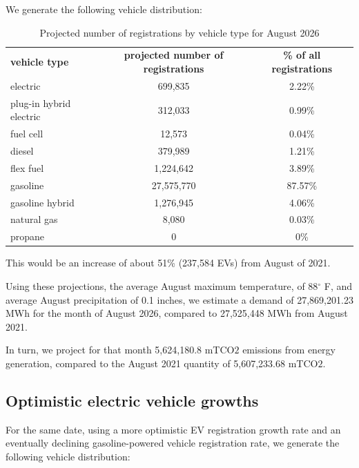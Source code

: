 \documentclass{article}
\begin{document}
We generate the following vehicle distribution:

\begin{table}[H]
    \centering
    \begin{tabular}{lcc}
        \textbf{vehicle type} & \textbf{projected number of registrations} & \textbf{\% of all registrations}\\
         electric & 699,835 & 2.22\%\\
         plug-in hybrid electric & 312,033 & 0.99\%\\
         fuel cell & 12,573 & 0.04\%\\
         diesel & 379,989 & 1.21\%\\
         flex fuel & 1,224,642 &  3.89\%\\
         gasoline & 27,575,770 & 87.57\%\\
         gasoline hybrid & 1,276,945 & 4.06\%\\
         natural gas & 8,080 & 0.03\%\\
         propane & 0 & 0\%
    \end{tabular}
    \caption{Projected number of registrations by vehicle type for August 2026}
    \label{table:projection}
\end{table}

This would be an increase of about 51\% (237,584 EVs) from August of 2021.

Using these projections, the average August maximum temperature, of 88$^{\circ}$ F, and average August precipitation of 0.1 inches, we estimate a demand of 27,869,201.23 MWh for the month of August 2026, compared to 27,525,448 MWh from August 2021.

In turn, we project for that month 5,624,180.8  mTCO\(2\) emissions from energy generation, compared to the August 2021 quantity of 5,607,233.68 mTCO\(2\).

\subsection{\label{results2}Optimistic electric vehicle growths}

For the same date, using a more optimistic EV registration growth rate and an eventually declining gasoline-powered vehicle registration rate, we generate the following vehicle distribution:
\end{document}
